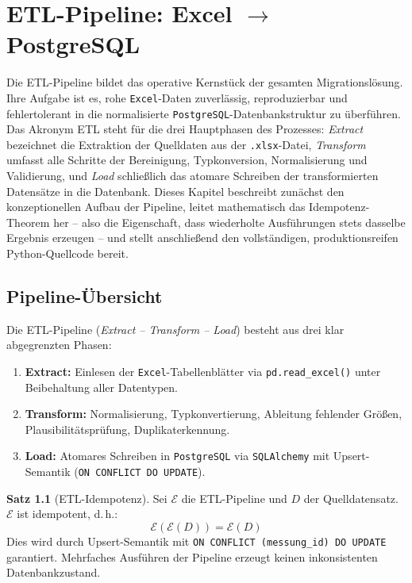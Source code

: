 \documentclass[12pt,a4paper]{report}
\theoremstyle{definition}
\newtheorem{theorem}{Satz}[section]
\theoremstyle{remark}
\newcommand{\excel}{\texttt{Excel}}
\newcommand{\pg}{\texttt{PostgreSQL}}
\newcommand{\sqlalchemy}{\texttt{SQLAlchemy}}
\newcommand{\code}[1]{\texttt{#1}}
\begin{document}
\chapter{ETL-Pipeline: Excel \texorpdfstring{$\to$}{->} PostgreSQL}

Die ETL-Pipeline bildet das operative Kernstück der gesamten Migrationslösung. Ihre Aufgabe ist es, rohe \excel{}-Daten zuverlässig, reproduzierbar und fehlertolerant in die normalisierte \pg{}-Datenbankstruktur zu überführen. Das Akronym ETL steht für die drei Hauptphasen des Prozesses: \textit{Extract} bezeichnet die Extraktion der Quelldaten aus der \code{.xlsx}-Datei, \textit{Transform} umfasst alle Schritte der Bereinigung, Typkonversion, Normalisierung und Validierung, und \textit{Load} schließlich das atomare Schreiben der transformierten Datensätze in die Datenbank. Dieses Kapitel beschreibt zunächst den konzeptionellen Aufbau der Pipeline, leitet mathematisch das Idempotenz-Theorem her -- also die Eigenschaft, dass wiederholte Ausführungen stets dasselbe Ergebnis erzeugen -- und stellt anschließend den vollständigen, produktionsreifen Python-Quellcode bereit.

\section{Pipeline-Übersicht}
Die ETL-Pipeline (\textit{Extract -- Transform -- Load}) besteht aus
drei klar abgegrenzten Phasen:

\begin{enumerate}[leftmargin=1.5em]
  \item \textbf{Extract:} Einlesen der \excel-Tabellenblätter via
        \code{pd.read\_excel()} unter Beibehaltung aller Datentypen.
  \item \textbf{Transform:} Normalisierung, Typkonvertierung, Ableitung
        fehlender Gr\"o\ss{}en, Plausibilitätsprüfung, Duplikaterkennung.
  \item \textbf{Load:} Atomares Schreiben in \pg{} via \sqlalchemy{}
        mit Upsert-Semantik (\code{ON CONFLICT DO UPDATE}).
\end{enumerate}

\begin{theorem}[ETL-Idempotenz]
  Sei $\mathcal{E}$ die ETL-Pipeline und $D$ der Quelldatensatz.
  $\mathcal{E}$ ist idempotent, d.\,h.:
  \[
    \mathcal{E}(\mathcal{E}(D)) = \mathcal{E}(D)
  \]
  Dies wird durch Upsert-Semantik mit \code{ON CONFLICT (messung\_id)
  DO UPDATE} garantiert. Mehrfaches Ausführen der Pipeline erzeugt
  keinen inkonsistenten Datenbankzustand.
\end{theorem}
\end{document}
